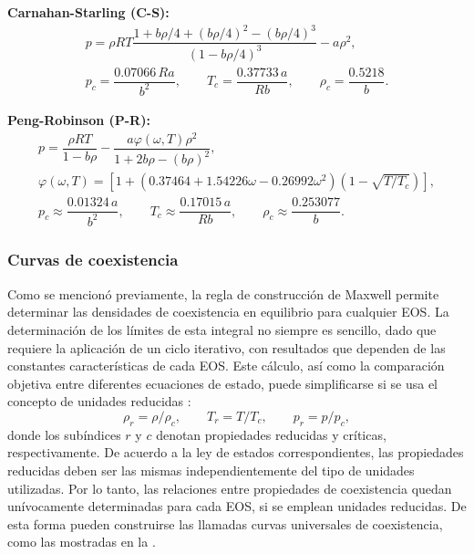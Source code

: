 \smallskip
\textbf{Carnahan-Starling (C-S):}
\begin{equation}
	\begin{gathered}
		p = \rho R T\dfrac{1+b\rho/4+(b\rho/4)^2-(b\rho/4)^3}{(1-b\rho/4)^3} - a\rho^2, \\[2mm]
		p_c = \dfrac{0.07066 \, Ra}{b^2}, \qquad T_c = \dfrac{0.37733 \, a}{Rb}, \qquad \rho_c = \dfrac{0.5218}{b}.
	\end{gathered}
	\label{eq:CS_eos}
\end{equation}


\textbf{Peng-Robinson (P-R):}
\begin{equation}
	\begin{gathered}
		p = \dfrac{\rho R T}{1-b\rho} - \dfrac{a\varphi(\omega,T)\rho^2}{1+2b\rho-(b\rho)^2}, \\[0mm]
		\varphi(\omega,T) = \left[ 1+(0.37464+1.54226\omega-0.26992\omega^2)(1-\sqrt{T/T_c})\right], \\[0mm]
		p_c \approx \dfrac{0.01324 \, a}{b^2}, \qquad
		T_c \approx \dfrac{0.17015 \, a}{Rb}, \qquad
		\rho_c \approx \dfrac{0.253077}{b}.
	\end{gathered}
	\label{eq:PR_eos}
\end{equation}



\subsubsection*{Curvas de coexistencia}

Como se mencion\'o previamente, la regla de construcci\'on de Maxwell permite determinar las densidades de coexistencia en equilibrio para cualquier EOS. La determinaci\'on de los l\'imites de esta integral no siempre es sencillo, dado que requiere la aplicaci\'on de un ciclo iterativo, con resultados que dependen de las constantes caracter\'isticas de cada EOS. Este c\'alculo, as\'i como la comparaci\'on objetiva entre diferentes ecuaciones de estado, puede simplificarse si se usa el concepto de unidades reducidas \cite{mcquarrie_molecular_1999}:
\begin{equation}
	\rho_r = \rho / \rho_c, \qquad T_r = T / T_c, \qquad p_r = p / p_c,
\end{equation}
donde los sub\'indices $r$ y $c$ denotan propiedades reducidas y cr\'iticas, respectivamente. De acuerdo a la ley de estados correspondientes, las propiedades reducidas deben ser las mismas independientemente del tipo de unidades utilizadas. Por lo tanto, las relaciones entre propiedades de coexistencia quedan un\'ivocamente determinadas para cada EOS, si se emplean unidades reducidas. De esta forma pueden construirse las llamadas curvas universales de coexistencia, como las mostradas en la .

